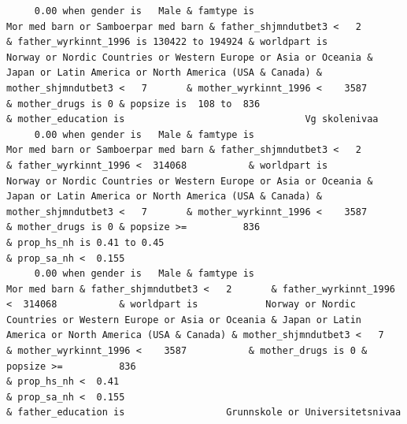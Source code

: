 \documentclass[
  letterpaper,
  DIV=11,
  numbers=noendperiod]{scrreprt}
\begin{document}
\begin{verbatim}
     0.00 when gender is   Male & famtype is                              Mor med barn or Samboerpar med barn & father_shjmndutbet3 <   2       & father_wyrkinnt_1996 is 130422 to 194924 & worldpart is            Norway or Nordic Countries or Western Europe or Asia or Oceania & Japan or Latin America or North America (USA & Canada) & mother_shjmndutbet3 <   7       & mother_wyrkinnt_1996 <    3587           & mother_drugs is 0 & popsize is  108 to  836                                                                                                                                                                        & mother_education is                                Vg skolenivaa                                                                                                                                                                     
     0.00 when gender is   Male & famtype is                              Mor med barn or Samboerpar med barn & father_shjmndutbet3 <   2       & father_wyrkinnt_1996 <  314068           & worldpart is            Norway or Nordic Countries or Western Europe or Asia or Oceania & Japan or Latin America or North America (USA & Canada) & mother_shjmndutbet3 <   7       & mother_wyrkinnt_1996 <    3587           & mother_drugs is 0 & popsize >=          836                                                                    & prop_hs_nh is 0.41 to 0.45                                                                                                                                           & prop_sa_nh <  0.155                                                                                                                                               
     0.00 when gender is   Male & famtype is                                                     Mor med barn & father_shjmndutbet3 <   2       & father_wyrkinnt_1996 <  314068           & worldpart is            Norway or Nordic Countries or Western Europe or Asia or Oceania & Japan or Latin America or North America (USA & Canada) & mother_shjmndutbet3 <   7       & mother_wyrkinnt_1996 <    3587           & mother_drugs is 0 & popsize >=          836                                                                    & prop_hs_nh <  0.41                                                                                                                                                   & prop_sa_nh <  0.155                                                     & father_education is                  Grunnskole or Universitetsnivaa                    

\end{verbatim}
\end{document}
